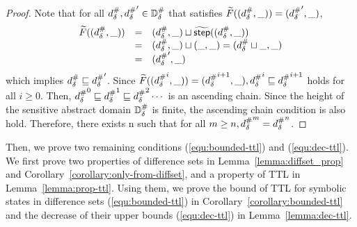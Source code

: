 \begin{proof}
Note that for all ${{d}^{\#}_\delta}, {{d}^{\#}_\delta}' \in {\mathbb{D}}^{\#}_\delta$ that satisfies
$\widetilde{F}(({{d}^{\#}_\delta}, \_)) = ({{d}^{\#}_\delta}', \_)$,
\[
  \begin{array}{rcl}
  \widetilde{F}(({{d}^{\#}_\delta}, \_))
  &=& ({{d}^{\#}_\delta}, \_) \sqcup \widetilde{\textsf{step}}(({{d}^{\#}_\delta}, \_))\\
  &=& ({{d}^{\#}_\delta}, \_) \sqcup (\_, \_) = ({{d}^{\#}_\delta} \sqcup \_, \_)\\
  &=& ({{d}^{\#}_\delta}', \_)
  \end{array}
\]
which implies ${{d}^{\#}_\delta} \sqsubseteq {{d}^{\#}_\delta}'$.  Since
$\widetilde{F}(({{d}^{\#}_\delta}^i, \_)) = ({{d}^{\#}_\delta}^{i+1}, \_), {{d}^{\#}_\delta}^i \sqsubseteq
{{d}^{\#}_\delta}^{i+1}$ holds for all $i \geq 0$.  Then, ${{d}^{\#}_\delta}^0 \sqsubseteq {{d}^{\#}_\delta}^1
\sqsubseteq {{d}^{\#}_\delta}^2 \cdots$ is an ascending chain.  Since the height of the
sensitive abstract domain ${\mathbb{D}}^{\#}_\delta$ is finite, the ascending chain condition is
also hold. Therefore, there exists n such that for all $m \geq n, {{d}^{\#}_\delta}^m =
{{d}^{\#}_\delta}^n$.
\end{proof}

Then, we prove two remaining conditions (\ref{equ:bounded-ttl}) and
(\ref{equ:dec-ttl}).  We first prove two properties of difference sets in
Lemma~\ref{lemma:diffset_prop} and Corollary~\ref{corollary:only-from-diffset},
and a property of TTL in Lemma~\ref{lemma:prop-ttl}.  Using them, we prove the
bound of TTL for symbolic states in difference sets (\ref{equ:bounded-ttl}) in
Corollary~\ref{corollary:bounded-ttl} and the decrease of their upper bounds
(\ref{equ:dec-ttl}) in Lemma~\ref{lemma:dec-ttl}.

